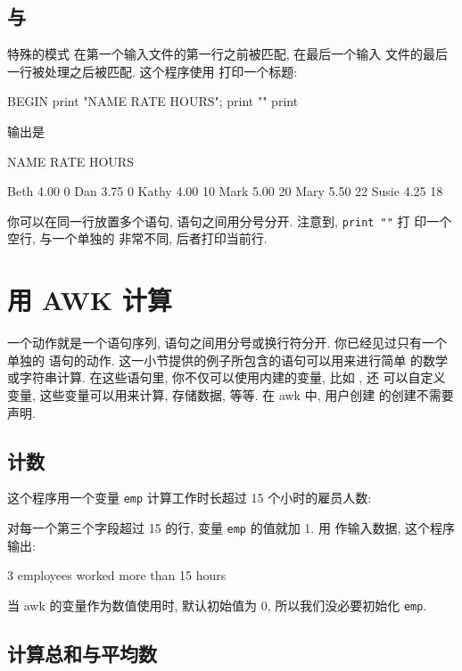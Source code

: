 \subsection{\BEGIN 与 \END}
\label{subsec:begin_and_end}

特殊的模式 \BEGIN 在第一个输入文件的第一行之前被匹配, \END 在最后一个输入
文件的最后一行被处理之后被匹配. 这个程序使用 \BEGIN 打印一个标题:
\begin{awkcode}
    BEGIN { print "NAME     RATE    HOURS"; print "" }
          { print }
\end{awkcode}
输出是
\begin{awkcode}
    NAME     RATE    HOURS

    Beth    4.00    0
    Dan     3.75    0
    Kathy   4.00    10
    Mark    5.00    20
    Mary    5.50    22
    Susie   4.25    18
\end{awkcode}
你可以在同一行放置多个语句, 语句之间用分号分开. 注意到, \verb'print ""' 打
印一个空行, 与一个单独的 \print 非常不同, 后者打印当前行.

\section{用 AWK 计算}
\label{sec:computing_with_awk}

一个动作就是一个语句序列, 语句之间用分号或换行符分开. 你已经见过只有一个
单独的 \print 语句的动作. 这一小节提供的例子所包含的语句可以用来进行简单
的数学或字符串计算. 在这些语句里, 你不仅可以使用内建的变量, 比如 \nf, 还
可以自定义变量, 这些变量可以用来计算, 存储数据, 等等. 在 awk 中, 用户创建
的创建不需要声明.

\subsection{计数}
\label{subsec:counting}

这个程序用一个变量 \texttt{emp} 计算工作时长超过 15 个小时的雇员人数:
对每一个第三个字段超过 15 的行, 变量 \texttt{emp} 的值就加 1. 用
 作输入数据, 这个程序输出:
\begin{file}
    3 employees worked more than 15 hours
\end{file}
当 awk 的变量作为数值使用时, 默认初始值为 0, 所以我们没必要初始化
\texttt{emp}.

\subsection{计算总和与平均数}
\label{subsec:computing_sums_and_averages}

